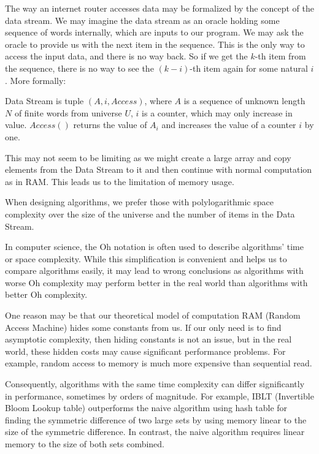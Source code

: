 The way an internet router accesses data may be formalized by the concept of the data stream.
We may imagine the data stream as an oracle holding some sequence of words internally, which are inputs to our program. We may ask the oracle to provide us with the next item in the sequence. This is the only way to access the input data, and there is no way back. So if we get the \(k\)-th item from the sequence, there is no way to see the \((k-i)\)-th item again for some natural \(i\). More formally:

\begin{defn}
Data Stream is tuple $(A, i, Access)$, where $A$ is a sequence of unknown length \(N\) of finite words from universe $U$, $i$ is a counter, which may only increase in value. $Access()$ returns the value of $A_i$ and increases the value of a counter $i$ by one.
\end{defn}

This may not seem to be limiting as we might create a large array and copy elements from the Data Stream to it and then continue with normal computation as in RAM. This leads us to the limitation of memory usage.

When designing algorithms, we prefer those with polylogarithmic space complexity over the size of the universe and the number of items in the Data Stream.

In computer science, the Oh notation is often used to describe algorithms' time or space complexity. While this simplification is convenient and helps us to compare algorithms easily, it may lead to wrong conclusions as algorithms with worse Oh complexity may perform better in the real world than algorithms with better Oh complexity.

One reason may be that our theoretical model of computation RAM (Random Access Machine) hides some constants from us. 
If our only need is to find asymptotic complexity, then hiding constants is not an issue, but in the real world, these hidden costs may cause significant performance problems. For example, random access to memory is much more expensive than sequential read.

Consequently, algorithms with the same time complexity can differ significantly in performance, sometimes by orders of magnitude. For example, IBLT (Invertible Bloom Lookup table) outperforms the naive algorithm using hash table for finding the symmetric difference of two large sets by using memory linear to the size of the symmetric difference. In contrast, the naive algorithm requires linear memory to the size of both sets combined.


